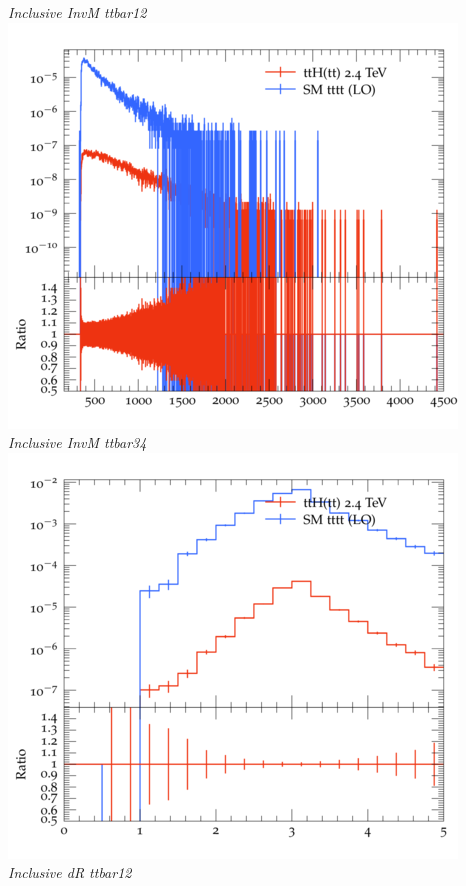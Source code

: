 \documentclass{beamer}
\begin{document}
\begin{frame}
\begin{columns}
\textit{\small Inclusive InvM ttbar12}
\includegraphics[width=\textwidth]{../plots/ttH_2400/tttt_ttH/Inclusive_InvM_ttbar34.png}\\
\textit{\small Inclusive InvM ttbar34}
\includegraphics[width=\textwidth]{../plots/ttH_2400/tttt_ttH/Inclusive_dR_ttbar12.png}\\
\textit{\small Inclusive dR ttbar12}
\end{columns}
\end{frame}
\end{document}
